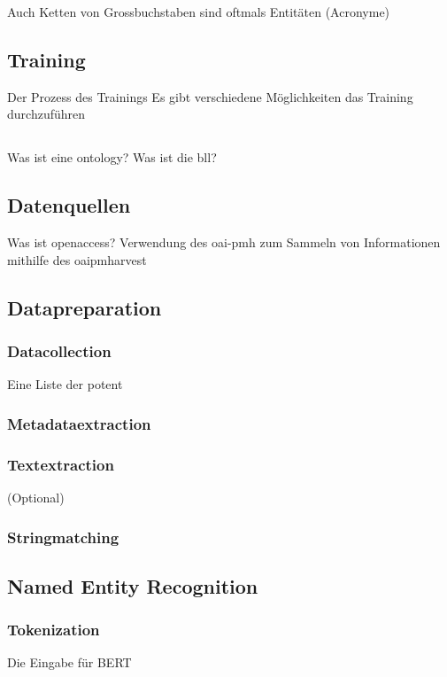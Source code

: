 \documentclass[
german,
]{bachelor}
\begin{document}
Auch Ketten von Grossbuchstaben sind oftmals Entitäten (Acronyme) %




\subsection{Training}
Der Prozess des Trainings
Es gibt verschiedene Möglichkeiten das Training durchzuführen




\subsection{}
Was ist eine \gls{ontology}?
Was ist die \gls{bll}?

\subsection{Datenquellen}
Was ist \gls{openaccess}?
Verwendung des \gls{oai-pmh} zum Sammeln von Informationen
mithilfe des \gls{oaipmharvest}



\subsection{Datapreparation}
\subsubsection{Datacollection}
Eine Liste der potent
\subsubsection{Metadataextraction}
\subsubsection{Textextraction} (Optional)
\subsubsection{Stringmatching}



\subsection{Named Entity Recognition}
\subsubsection{Tokenization}
Die Eingabe für BERT %
\end{document}

